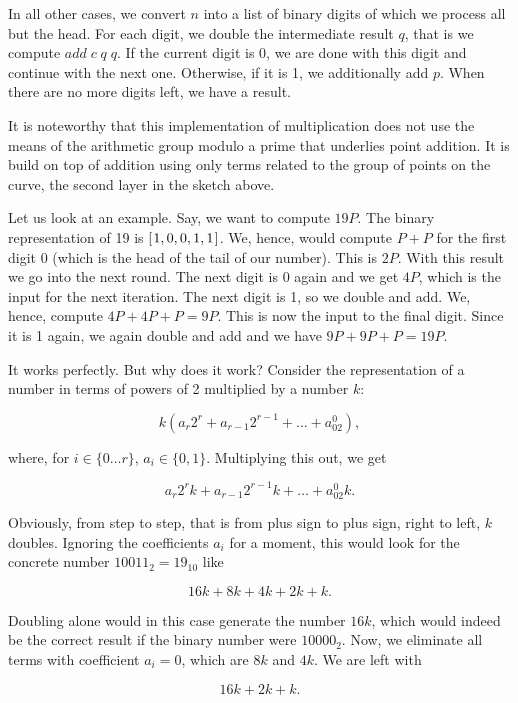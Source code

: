 \documentclass[tikz]{scrreprt}
\newcommand{\Varid}[1]{\mathit{#1}}
\begin{document}
In all other cases, we convert $n$ into a list
of binary digits of which we process all but the head.
For each digit, we double the intermediate result $q$,
that is we compute \ensuremath{\Varid{add}\;\Varid{c}\;\Varid{q}\;\Varid{q}}.
If the current digit is 0, we are done with this digit and continue
with the next one.
Otherwise, if it is 1, we additionally add $p$.
When there are no more digits left,
we have a result.

It is noteworthy that this implementation of multiplication
does not use the means of the arithmetic group modulo a prime
that underlies point addition. It is build on top of addition
using only terms related to the group of points on the curve,
the second layer in the sketch above.

Let us look at an example. Say, we want to
compute $19P$.
The binary representation of 19 is \ensuremath{[\mskip1.5mu \mathrm{1},\mathrm{0},\mathrm{0},\mathrm{1},\mathrm{1}\mskip1.5mu]}.
We, hence, would compute $P+P$ for the first digit 0 
(which is the head of the tail of our number).
This is $2P$. With this result we go into the next round.
The next digit is 0 again and we get $4P$,
which is the input for the next iteration.
The next digit is 1, so we double and add.
We, hence, compute $4P+4P+P = 9P$.
This is now the input to the final digit.
Since it is 1 again, we again double and add
and we have $9P+9P+P=19P$.

It works perfectly. But why does it work? Consider
the representation of a number in terms of
powers of 2 multiplied by a number $k$:

\[
k(a_r2^r + a_{r-1}2^{r-1} + \dots + a_02^0),
\]

where, for $i \in \lbrace 0\dots r\rbrace$, 
$a_i \in \lbrace 0,1\rbrace$.
Multiplying this out, we get

\[
a_r2^rk + a_{r-1}2^{r-1}k + \dots + a_02^0k.
\]

Obviously, from step to step, that is from plus sign
to plus sign, right to left, $k$ doubles. 
Ignoring the coefficients $a_i$
for a moment, this would look for the concrete number
$10011_2 = 19_{10}$ like

\[
16k + 8k + 4k + 2k + k.
\]

Doubling alone would in this case generate the number $16k$,
which would indeed be the correct result if the 
binary number were $10000_2$.
Now, we eliminate all terms with coefficient $a_i = 0$,
which are $8k$ and $4k$. We are left with

\[
16k + 2k + k.
\]
\end{document}
